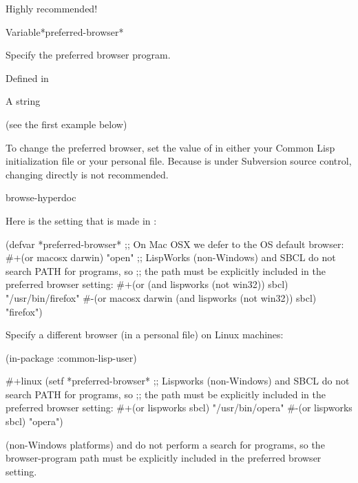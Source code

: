 \documentclass[10pt,twoside,english,pdftex]{article}
\begin{document}
Highly recommended!


\W\entities
\T\clearpage
\T\renewcommand{\headrulewidth}{0.01pt}


\begin{functiondoc}{Variable}{*preferred-browser*}{}%

\fnsyntax

\fnpurpose Specify the preferred browser program.

\fnpackage {}

\fnmodule Defined in 

\fnvaluetype A string

\fninitialvalue (see the first example below)

\fndescription To change the preferred browser, set the value of
 in either your Common Lisp initialization
file or your personal  file.  Because
 is under Subversion source control, changing
 directly is not recommended.

\begin{alsos}{browse-hyperdoc}
\end{alsos}

\fnexamples
Here is the setting that is made in :
%
\W\supp
\begin{example}
  (defvar *preferred-browser* 
      ;; On Mac OSX we defer to the OS default browser:
      #+(or macosx darwin)
      "open"
      ;; LispWorks (non-Windows) and SBCL do not search PATH for programs, so
      ;; the path must be explicitly included in the preferred browser setting:
      #+(or (and lispworks (not win32)) sbcl) "/usr/bin/firefox"
      #-(or macosx darwin (and lispworks (not win32)) sbcl) "firefox")
\end{example}

Specify a different browser (in a personal 
file) on Linux machines:
%
\W\supp
\begin{example}
  (in-package :common-lisp-user)

  #+linux
  (setf *preferred-browser* 
    ;; Lispworks (non-Windows) and SBCL do not search PATH for programs, so
    ;; the path must be explicitly included in the preferred browser setting:
     #+(or lispworks sbcl) "/usr/bin/opera"
     #-(or lispworks sbcl) "opera")
\end{example}

\fnnote {} (non-Windows
platforms) and  do not perform a
 search for programs, so the browser-program path must be explicitly
included in the preferred browser setting.

\end{functiondoc}
\end{document}
